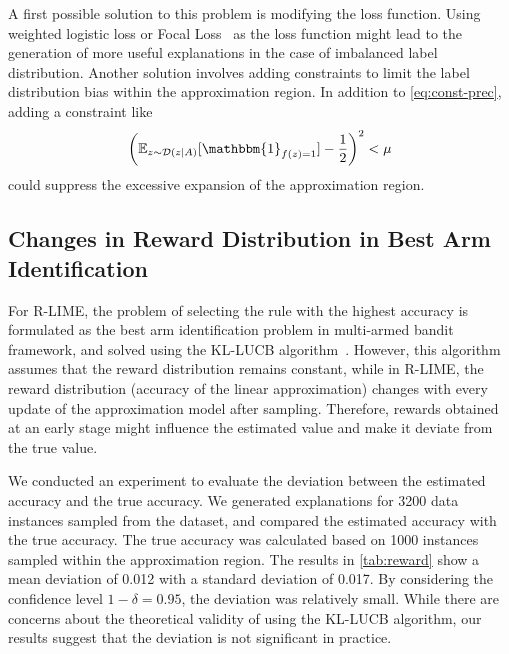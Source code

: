 \documentclass[runningheads]{llncs}
\begin{document}
A first possible solution to this problem is modifying the loss function.
Using weighted logistic loss or Focal Loss~\cite{lin2020focal}
as the loss function might lead to the generation of more useful explanations
in the case of imbalanced label distribution.
Another solution involves adding constraints
to limit the label distribution bias within the approximation region.
In addition to \cref{eq:const-prec}, adding a constraint like
\begin{equation}
  {%
    \left(
    \mathbb{E}_{z\sim\mathcal{D}(z\mid A)}[\mathbbm{1}_{f(z)=1}]-\frac{1}{2}
    \right)
  }^2<\mu
\end{equation}
could suppress the excessive expansion of the approximation region.

\subsection{Changes in Reward Distribution in Best Arm Identification}\label{sec:reward}
{%
  \renewcommand{\arraystretch}{1.1}
  \begin{table}[tbp]
    \centering
    \caption[Deviation between the estimated accuracy and the true accuracy]{%
      Deviation between the estimated accuracy and the true accuracy
      of the linear classifier learned by R-LIME\@.
      The deviation $0.012\pm0.017$ was relatively small
      considering the confidence level $1-\delta=0.95$.
    }\label{tab:reward}
    
  \end{table}
}
For R-LIME,
the problem of selecting the rule with the highest accuracy is formulated
as the best arm identification problem in multi-armed bandit framework,
and solved using the KL-LUCB algorithm~\cite{kaufmann2013information}.
However, this algorithm assumes that the reward distribution remains constant,
while in R-LIME,
the reward distribution (accuracy of the linear approximation)
changes with every update of the approximation model after sampling.
Therefore, rewards obtained at an early stage
might influence the estimated value and
make it deviate from the true value.

We conducted an experiment to evaluate the deviation
between the estimated accuracy and the true accuracy.
We generated explanations for 3200 data instances sampled from the dataset,
and compared the estimated accuracy with the true accuracy.
The true accuracy was calculated based on 1000 instances sampled
within the approximation region.
The results in \cref{tab:reward} show a mean deviation of 0.012
with a standard deviation of 0.017.
By considering the confidence level $1-\delta=0.95$,
the deviation was relatively small.
While there are concerns about the theoretical validity of using the KL-LUCB algorithm,
our results suggest that the deviation is not significant in practice.
\end{document}
